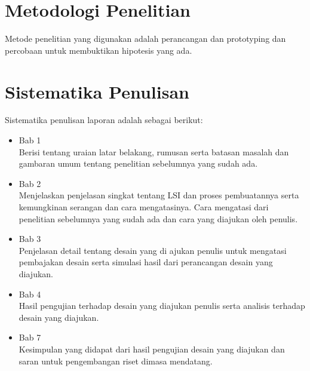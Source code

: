 \section{Metodologi Penelitian}
Metode penelitian yang digunakan adalah perancangan dan prototyping dan percobaan untuk membuktikan hipotesis yang ada.

% 

\section{Sistematika Penulisan}
Sistematika penulisan laporan adalah sebagai berikut:

\begin{itemize}
	
	\item Bab 1 \babSatu \\
	Berisi tentang uraian latar belakang, rumusan serta batasan masalah dan gambaran umum tentang penelitian sebelumnya yang sudah ada.
	
	\item Bab 2 \babDua \\
	Menjelaskan penjelasan singkat tentang LSI dan proses pembuatannya serta kemungkinan serangan dan cara mengatasinya. Cara mengatasi dari penelitian sebelumnya yang sudah ada dan cara yang diajukan oleh penulis.
	
	\item Bab 3 \babTiga \\
	Penjelasan detail tentang desain yang di ajukan penulis untuk mengatasi pembajakan desain serta simulasi hasil dari perancangan desain yang diajukan.

	\item Bab 4 \babEmpat \\
	Hasil pengujian terhadap desain yang diajukan penulis serta analisis terhadap desain yang diajukan.
	
	\item Bab 7 \kesimpulan \\
	Kesimpulan yang didapat dari hasil pengujian desain yang diajukan dan saran untuk pengembangan riset dimasa mendatang.
\end{itemize}